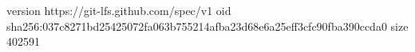 version https://git-lfs.github.com/spec/v1
oid sha256:037c8271bd25425072fa063b755214afba23d68e6a25eff3cfc90fba390ccda0
size 402591
